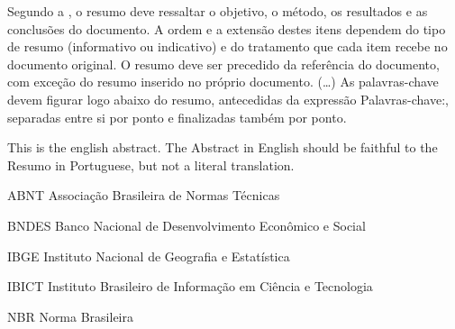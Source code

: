 \documentclass[
	12pt,				%
	openright,			%
	twoside,			%
	a4paper,			%
	tcc,			%
	]{ABNT-CCT-UENP}
\begin{document}

\begin{resumo}
 Segundo a , o resumo deve ressaltar o
 objetivo, o método, os resultados e as conclusões do documento. A ordem e a extensão
 destes itens dependem do tipo de resumo (informativo ou indicativo) e do
 tratamento que cada item recebe no documento original. O resumo deve ser
 precedido da referência do documento, com exceção do resumo inserido no
 próprio documento. (\ldots) As palavras-chave devem figurar logo abaixo do
 resumo, antecedidas da expressão Palavras-chave:, separadas entre si por
 ponto e finalizadas também por ponto.
\end{resumo}

\begin{Abstract}
 This is the english abstract. The Abstract in English should be faithful to the
 Resumo in Portuguese, but not a literal translation.
\end{Abstract}

\listoffigures*
\cleardoublepage

\listoftables*
\cleardoublepage

\begin{siglas}
  \item[ABNT] Associação Brasileira de Normas Técnicas
  \item[BNDES] Banco Nacional de Desenvolvimento Econômico e Social
  \item[IBGE] Instituto Nacional de Geografia e Estatística
  \item[IBICT] Instituto Brasileiro de Informação em Ciência e Tecnologia
  \item[NBR] Norma Brasileira
\end{siglas}

\end{document}
